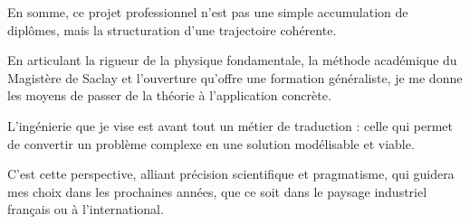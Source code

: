 En somme, ce projet professionnel n'est pas une simple accumulation de diplômes, 
mais la structuration d'une trajectoire cohérente. 

En articulant la rigueur de la physique fondamentale, 
la méthode académique du Magistère de Saclay 
et l'ouverture qu'offre une formation généraliste, 
je me donne les moyens de passer de la théorie à l'application concrète. 

L'ingénierie que je vise est avant tout un métier de traduction : 
celle qui permet de convertir un problème complexe en une solution modélisable et viable. 

C'est cette perspective, alliant précision scientifique et pragmatisme, 
qui guidera mes choix dans les prochaines années, 
que ce soit dans le paysage industriel français ou à l'international.